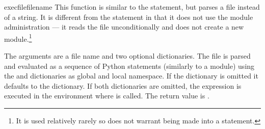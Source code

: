 \begin{funcdesc}{execfile}{filename}
  This function is similar to the
   statement, but parses a file instead of a string.  It
  is different from the  statement in that it does not
  use the module administration --- it reads the file unconditionally
  and does not create a new module.\footnote{It is used relatively
  rarely so does not warrant being made into a statement.}

  The arguments are a file name and two optional dictionaries.  The
  file is parsed and evaluated as a sequence of Python statements
  (similarly to a module) using the  and 
  dictionaries as global and local namespace.  If the 
  dictionary is omitted it defaults to the  dictionary.
  If both dictionaries are omitted, the expression is executed in the
  environment where  is called.  The return value is
  .

\end{funcdesc}

